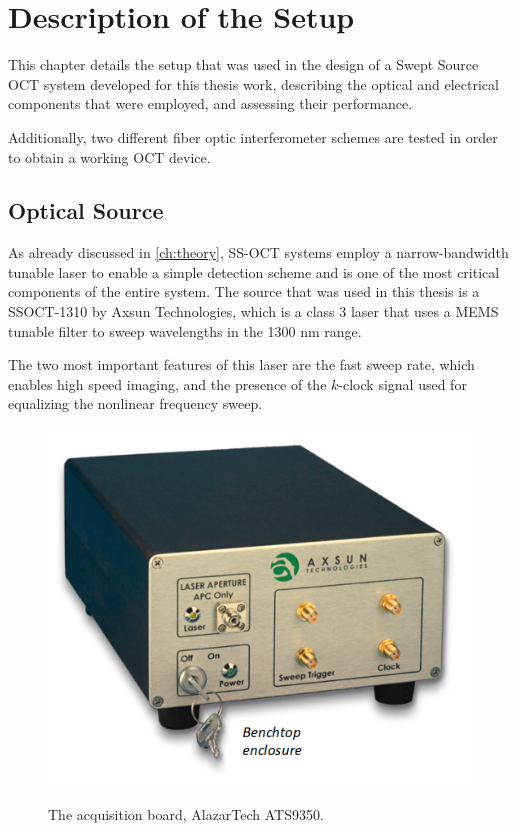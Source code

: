 
\chapter{Description of the Setup} %
\label{ch:setup} %

This chapter details the setup that was used in the design of a Swept Source OCT system developed for this thesis work, describing the optical and electrical components that were employed, and assessing their performance. 

\noindent Additionally, two different fiber optic interferometer schemes are tested in order to obtain a working OCT device. 

\section{Optical Source}
As already discussed in \autoref{ch:theory}, \ac{SS-OCT} systems employ a narrow-bandwidth tunable laser to enable a simple detection scheme and is one of the most critical components of the entire system. The source that was used in this thesis is a SSOCT-1310 by Axsun Technologies, which is a class 3 laser that uses a \ac{MEMS} tunable filter to sweep wavelengths in the 1300 nm range. 

The two most important features of this laser are the fast sweep rate, which enables high speed imaging, and the presence of the $k$-clock signal used for equalizing the nonlinear frequency sweep. 

\begin{figure}[bth]
	\myfloatalign
	{\includegraphics[width=.6\linewidth]{gfx/ch3/axsun}}
	\caption{The acquisition board, AlazarTech ATS9350.}\label{fig:axsun-laser}
\end{figure}

